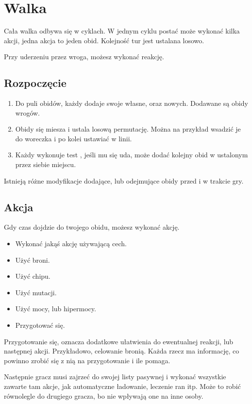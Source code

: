 \chapter{Walka}

Cała walka odbywa się w cyklach.
W jednym cyklu postać może wykonać kilka akcji, jedna akcja to jeden obid.
Kolejność tur jest ustalana losowo.

Przy uderzeniu przez wroga, możesz wykonać reakcję.

\section{Rozpoczęcie}
\begin{enumerate}
	\item Do puli obidów, każdy dodaje swoje własne, oraz \dvi{} nowych. Dodawane są obidy wrogów.
	\item Obidy się miesza i ustala losową permutację. Można na przykład wsadzić je do woreczka i po kolei ustawiać w linii.
	\item Każdy wykonuje test \abp{}, jeśli mu się uda, może dodać kolejny obid w ustalonym przez siebie miejscu.
\end{enumerate}
Istnieją różne modyfikacje dodające, lub odejmujące obidy przed i w trakcie gry.

\section{Akcja}
Gdy czas dojdzie do twojego obidu, możesz wykonać akcję.
\begin{itemize}
	\item Wykonać jakąś akcję używającą cech.
	\item Użyć broni.
	\item Użyć chipu.
	\item Użyć mutacji.
	\item Użyć mocy, lub hipermocy.
	\item Przygotować się.
\end{itemize}
Przygotowanie się, oznacza dodatkowe ułatwienia do ewentualnej reakcji, lub następnej akcji.
Przykładowo, celowanie bronią.
Każda rzecz ma informację, co powinno zrobić się z nią na przygotowanie i ile pomaga.

Następnie gracz musi zajrzeć do swojej listy pasywnej i wykonać wszystkie zawarte tam akcje, jak automatyczne ładowanie, leczenie ran itp.
Może to robić równolegle do drugiego gracza, bo nie wpływają one na inne osoby.

